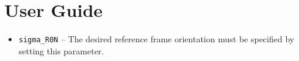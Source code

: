 
\section{User Guide}
\begin{itemize}
	\item {\tt sigma\_R0N} -- The desired reference frame orientation must be specified by setting this parameter.
\end{itemize}
